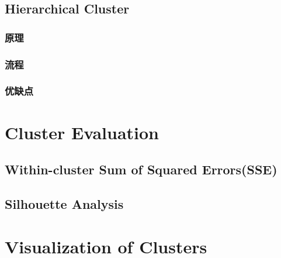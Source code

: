\subsection{Hierarchical Cluster}
\subsubsection{原理}
\subsubsection{流程}
\subsubsection{优缺点}

\section{Cluster Evaluation}

\subsection{Within-cluster Sum of Squared Errors(SSE)}

\subsection{Silhouette Analysis}

\section{Visualization of Clusters}